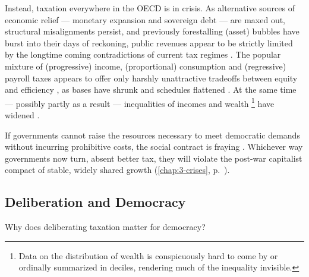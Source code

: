 Instead, taxation everywhere in the \gls{OECD} is in crisis.
As alternative sources of economic relief --- monetary expansion and sovereign debt --- are maxed out, structural misalignments persist, and previously forestalling (asset) bubbles have burst into their days of reckoning, public revenues appear to be strictly limited by the longtime coming contradictions of current tax regimes \citep{Streeck2013}. %
The popular mixture of (progressive) income, (proportional) consumption and (regressive) payroll taxes appears to offer only harshly unattractive tradeoffs between equity and efficiency \citep{McCafferyHines2010}, as bases have shrunk and schedules flattened \citep{Ganghof2006}.
At the same time --- possibly partly as a result --- inequalities of incomes and wealth
\footnote{
	Data on the distribution of wealth is conspicuously hard to come by \citep[158]{Crouch2004} or ordinally summarized in deciles, rendering much of the inequality invisible.
}
 have widened \citep{Butterwegge,Wagner2007,Grabka2007}.

If governments cannot raise the resources necessary to meet democratic demands without incurring prohibitive costs, the social contract is fraying \citep{Crouch2004}.%
Whichever way governments now turn, absent better tax, they will violate the post-war capitalist compact of stable, widely shared growth \citep{Pierson2002,StreeckMertens2010} (\autoref{chap:3-crises}, p.~\pageref{chap:3-crises}). %

\subsection{Deliberation and Democracy}
Why does deliberating taxation matter for democracy?

